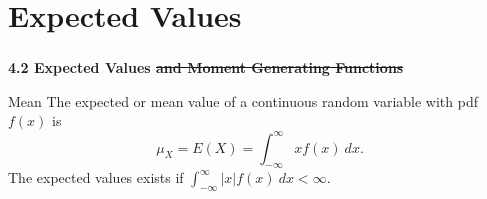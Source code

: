 \section{Expected Values}
\begin{frame}
  \frametitle{}

  \begin{center}
    \Large{\textbf{4.2 Expected Values \sout{and Moment Generating Functions}}}
  \end{center}

  \bigskip



\end{frame}

\begin{frame}
  
  \begin{block}{Mean}
    The expected or mean value of a continuous random variable with pdf $f(x)$ is
    \[
      \mu_X=E(X)=\int_{-\infty}^{\infty} xf(x) ~dx.
    \]
    The expected values exists if $\int_{-\infty}^{\infty} |x|f(x) ~dx< \infty$.
  \end{block}
\end{frame}

